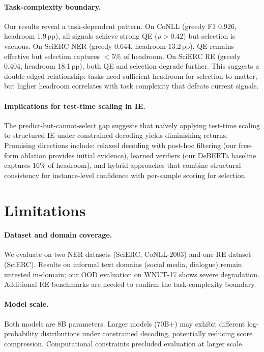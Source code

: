 \documentclass[11pt,a4paper]{article}
\begin{document}
\paragraph{Task-complexity boundary.}
Our results reveal a task-dependent pattern. On CoNLL (greedy F1 0.926, headroom 1.9\,pp), all signals achieve strong QE ($\rho > 0.42$) but selection is vacuous. On SciERC NER (greedy 0.644, headroom 13.2\,pp), QE remains effective but selection captures $< 5\%$ of headroom. On SciERC RE (greedy 0.404, headroom 18.1\,pp), both QE and selection degrade further. This suggests a double-edged relationship: tasks need sufficient headroom for selection to matter, but higher headroom correlates with task complexity that defeats current signals.

\paragraph{Implications for test-time scaling in IE.}
The predict-but-cannot-select gap suggests that na\"{i}vely applying test-time scaling to structured IE under constrained decoding yields diminishing returns. Promising directions include: relaxed decoding with post-hoc filtering (our free-form ablation provides initial evidence), learned verifiers (our DeBERTa baseline captures 16\% of headroom), and hybrid approaches that combine structural consistency for instance-level confidence with per-sample scoring for selection.

\section{Limitations}

\paragraph{Dataset and domain coverage.} We evaluate on two NER datasets (SciERC, CoNLL-2003) and one RE dataset (SciERC). Results on informal text domains (social media, dialogue) remain untested in-domain; our OOD evaluation on WNUT-17 shows severe degradation. Additional RE benchmarks are needed to confirm the task-complexity boundary.

\paragraph{Model scale.} Both models are 8B parameters. Larger models (70B+) may exhibit different log-probability distributions under constrained decoding, potentially reducing score compression. Computational constraints precluded evaluation at larger scale.
\end{document}
